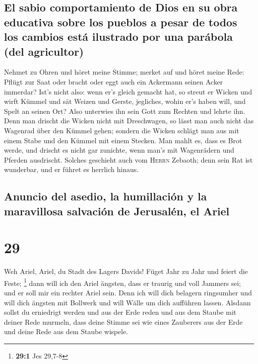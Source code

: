 \hypertarget{el-sabio-comportamiento-de-dios-en-su-obra-educativa-sobre-los-pueblos-a-pesar-de-todos-los-cambios-estuxe1-ilustrado-por-una-paruxe1bola-del-agricultor}{%
\subsection{El sabio comportamiento de Dios en su obra educativa sobre
los pueblos a pesar de todos los cambios está ilustrado por una parábola
(del
agricultor)}\label{el-sabio-comportamiento-de-dios-en-su-obra-educativa-sobre-los-pueblos-a-pesar-de-todos-los-cambios-estuxe1-ilustrado-por-una-paruxe1bola-del-agricultor}}

 Nehmet zu Ohren und höret meine Stimme; merket auf und
höret meine Rede:  Pflügt zur Saat oder bracht oder eggt
auch ein Ackermann seinen Acker immerdar?  Ist's nicht
also: wenn er's gleich gemacht hat, so streut er Wicken und wirft Kümmel
und sät Weizen und Gerste, jegliches, wohin er's haben will, und Spelt
an seinen Ort?  Also unterwies ihn sein Gott zum Rechten
und lehrte ihn.  Denn man drischt die Wicken nicht mit
Dreschwagen, so lässt man auch nicht das Wagenrad über den Kümmel gehen;
sondern die Wicken schlägt man aus mit einem Stabe und den Kümmel mit
einem Stecken.  Man mahlt es, dass es Brot werde, und
drischt es nicht gar zunichte, wenn man's mit Wagenrädern und Pferden
ausdrischt.  Solches geschieht auch vom \textsc{Herrn}
Zebaoth; denn sein Rat ist wunderbar, und er führet es herrlich hinaus.

\hypertarget{anuncio-del-asedio-la-humillaciuxf3n-y-la-maravillosa-salvaciuxf3n-de-jerusaluxe9n-el-ariel}{%
\subsection{Anuncio del asedio, la humillación y la maravillosa
salvación de Jerusalén, el
Ariel}\label{anuncio-del-asedio-la-humillaciuxf3n-y-la-maravillosa-salvaciuxf3n-de-jerusaluxe9n-el-ariel}}

\hypertarget{section-28}{%
\section{29}\label{section-28}}

 Weh Ariel, Ariel, du Stadt des Lagers Davids! Füget Jahr
zu Jahr und feiert die Feste; \footnote{\textbf{29:1} Jes 29,7-8}
 dann will ich den Ariel ängsten, dass er traurig und voll
Jammers sei; und er soll mir ein rechter Ariel sein.  Denn
ich will dich belagern ringsumher und will dich ängsten mit Bollwerk und
will Wälle um dich aufführen lassen.  Alsdann sollst du
erniedrigt werden und aus der Erde reden und aus dem Staube mit deiner
Rede murmeln, dass deine Stimme sei wie eines Zauberers aus der Erde und
deine Rede aus dem Staube wispele.

